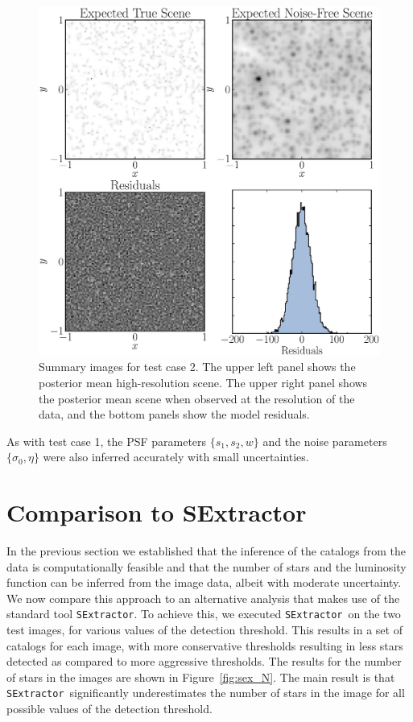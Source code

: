 \documentclass[12pt, preprint]{aastex}
\newcommand{\sex}{{\tt SExtractor}}
\begin{document}
\begin{figure}[ht!]
\begin{center}
\includegraphics[width=\textwidth]{Figures/summaries.eps}
\end{center}
\caption{Summary images for test case 2. The upper left panel shows the posterior
mean high-resolution scene. The upper right panel shows the posterior mean scene
when observed at the resolution of the data, and the bottom panels show the
model residuals.
\label{fig:summaries}}
\end{figure}

As with test case 1, the PSF parameters $\{s_1, s_2, w\}$ and the noise parameters $\{\sigma_0, \eta\}$
were also inferred accurately with small uncertainties.

\section{Comparison to SExtractor}\label{sec:sex}
In the previous section we established that the inference of the catalogs from
the data is computationally feasible and that the number of stars and the
luminosity function can be inferred from the image data, albeit with moderate
uncertainty. We now compare this approach to an alternative analysis that makes
use of the standard
tool \sex. To achieve this, we executed \sex~on the two test images, for various
values of the detection threshold. This results in a set of catalogs
for each image, with more conservative thresholds resulting in less stars detected
as compared to more aggressive thresholds. The results for the number of stars in
the images are shown in Figure~\ref{fig:sex_N}. The main result is that
\sex~significantly underestimates the number of stars in the image for all
possible values of the detection threshold.
\end{document}
